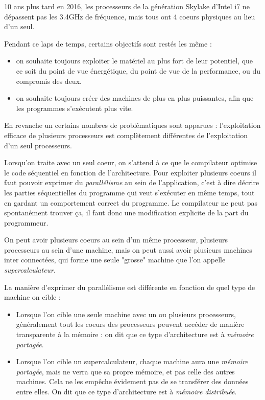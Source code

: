 10 ans plus tard en 2016, les processeurs de la génération Skylake d'Intel i7 ne dépassent pas les 3.4GHz de fréquence, mais tous ont 4 coeurs physiques au lieu d'un seul.

Pendant ce laps de temps, certains objectifs sont restés les même :
\begin{itemize}
  \item on souhaite toujours exploiter le matériel au plus fort de leur potentiel, que ce soit du point de vue énergétique, du point de vue de la performance, ou du compromis des deux.
  \item on souhaite toujours créer des machines de plus en plus puissantes, afin que les programmes s'exécutent plus vite.
\end{itemize}

En revanche un certains nombres de problématiques sont apparues : l'exploitation efficace de plusieurs processeurs est complètement différentes de l'exploitation d'un seul processeurs.

Lorsqu'on traite avec un seul coeur, on s'attend à ce que le compilateur optimise le code séquentiel en fonction de l'architecture.
Pour exploiter plusieurs coeurs il faut pouvoir exprimer du \emph{parallélisme} au sein de l'application, c'est à dire décrire les parties séquentielles du programme qui veut s'exécuter en même temps, tout en gardant un comportement correct du programme.
Le compilateur ne peut pas spontanément trouver ça, il faut donc une modification explicite de la part du programmeur.

On peut avoir plusieurs coeurs au sein d'un même processeur, plusieurs processeurs au sein d'une machine, mais on peut aussi avoir plusieurs machines inter connectées, qui forme une seule "grosse" machine que l'on appelle \emph{supercalculateur}.

La manière d'exprimer du parallélisme est différente en fonction de quel type de machine on cible :
\begin{itemize}
  \item Lorsque l'on cible une seule machine avec un ou plusieurs processeurs, généralement tout les coeurs des processeurs peuvent accéder de manière transparente à la mémoire : on dit que ce type d'architecture est à \emph{mémoire partagée}.
  \item Lorsque l'on cible un supercalculateur, chaque machine aura une \emph{mémoire partagée}, mais ne verra que sa propre mémoire, et pas celle des autres machines. Cela ne les empêche évidement pas de se transférer des données entre elles. On dit que ce type d'architecture est à \emph{mémoire distribuée}.
\end{itemize}

